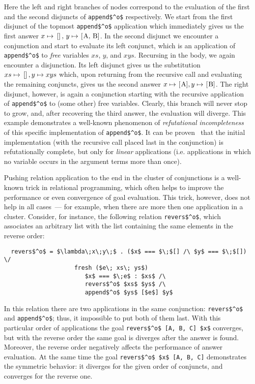 Here the left and right branches of nodes correspond to the evaluation of the first and the second disjuncts of \lstinline|append$^o$| respectively. We start from
the first disjunct of the topmost \lstinline|append$^o$| application which immediately gives us the first answer $x\mapsto\mbox{\lstinline|[]|},\,y\mapsto\mbox{\lstinline|[A, B]|}$.
In the second disjunct we encounter a conjunction and start to evaluate its left conjunct, which is an application of \lstinline|append$^o$| to \emph{free} variables
$xs$, $y$, and $xys$. Recursing in the body, we again encounter a disjunction. Its left disjunct gives us the substitution $xs\mapsto\mbox{\lstinline|[]|},y\mapsto xys$ which, upon 
returning from the recursive call and evaluating the remaining conjuncts, gives us the second answer $x\mapsto\mbox{\lstinline|[A]|},y\mapsto\mbox{\lstinline|[B]|}$. The right
disjunct, however, is again a conjunction starting with the recursive application of \lstinline|append$^o$| to (some other) free variables. Clearly, this branch will never stop to
grow, and, after recovering the third answer, the evaluation will diverge. This example demonstrates a well-known phenomenon of \emph{refutational incompleteness}~\cite{fair:WillThesis}
of this specific implementation of \lstinline|append$^o$|. It can be proven~\cite{fair:semantics} that the initial implementation (with the recursive call placed last in the conjunction)
is refutationally complete, but only for \emph{linear} applications (i.e. applications in which no variable occurs in the argument terms more than once).

Pushing relation application to the end in the cluster of conjunctions is a well-known trick in relational programming, which often helps to improve the performance or even
convergence of goal evaluation. This trick, however, does not help in all cases~--- for example, when there are more then one application in a cluster. Consider, for instance, the
following relation \lstinline{revers$^o$}, which associates an arbitrary list with the list containing the same elements in the reverse order:

\begin{lstlisting}
  revers$^o$ = $\lambda\;x\;y\;$ . ($x$ === $\;$[] /\ $y$ === $\;$[]) \/
                    fresh ($e\; xs\; ys$) 
                       $x$ === $\;e$ : $xs$ /\ 
                       revers$^o$ $xs$ $ys$ /\
                       append$^o$ $ys$ [$e$] $y$
\end{lstlisting}

In this relation there are two applications in the same conjunction: \lstinline{revers$^o$} and \lstinline{append$^o$}; thus, it impossible to put both of them last. With this particular
order of applications the goal \lstinline|revers$^o$ [A, B, C] $x$| converges, but with the reverse order the same goal is diverges after the answer is found. Moreover, the reverse order negatively
affects the performance of answer evaluation. At the same time the goal \lstinline|revers$^o$ $x$ [A, B, C]| demonstrates the symmetric behavior: it diverges for the given order of conjuncts,
and converges for the reverse one.

